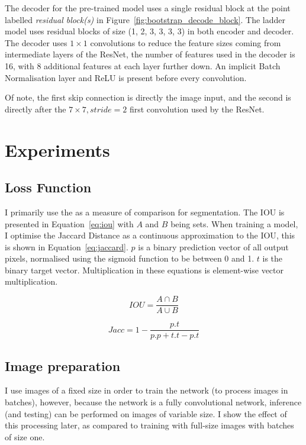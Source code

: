 The decoder for the pre-trained model uses a single residual block at the point labelled \emph{residual block(s)} in Figure~\ref{fig:bootstrap_decode_block}. The ladder model uses residual blocks of size (1, 2, 3, 3, 3, 3) in both encoder and decoder. The decoder uses $ 1\times1 $ convolutions to reduce the feature sizes coming from intermediate layers of the ResNet, the number of features used in the decoder is 16, with 8 additional features at each layer further down. An implicit Batch Normalisation layer and ReLU is present before every convolution.

Of note, the first skip connection is directly the image input, and the second is directly after the $7\times7, stride=2$ first convolution used by the ResNet.


\section {Experiments}


\subsection {Loss Function}


I primarily use the  as a measure of comparison for segmentation. The \gls{IOU} is presented in Equation~\ref{eq:iou} with $ A $ and $ B $ being sets. When training a model, I optimise the Jaccard Distance as a continuous approximation to the \gls{IOU}, this is shown in Equation~\ref{eq:jaccard}.  $ p $ is a binary prediction vector of all output pixels, normalised using the sigmoid function to be between 0 and 1. $ t $ is the binary target vector. Multiplication in these equations is element-wise vector multiplication.


\begin{equation}
IOU = \frac{A \cap B}{A \cup B}
\label{eq:iou}
\end{equation}


\begin{equation}
Jacc = 1 - \frac{p.t}{p.p + t.t - p.t}
\label{eq:jaccard}
\end{equation}



\subsection {Image preparation}

I use images of a fixed size in order to train the network (to process images in batches), however, because the network is a fully convolutional network, inference (and testing) can be performed on images of variable size. I show the effect of this processing later, as compared to training with full-size images with batches of size one.

